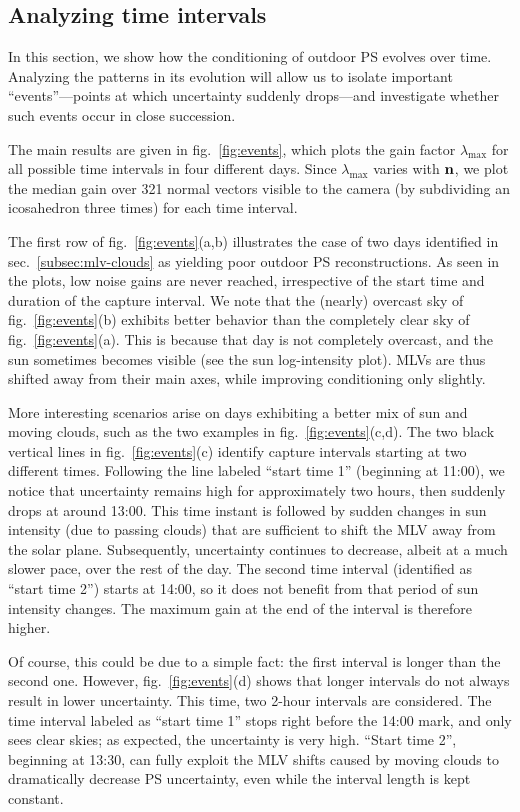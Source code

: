 \subsection{Analyzing time intervals}

In this section, we show how the conditioning of outdoor PS evolves over time. Analyzing the patterns in its evolution will allow us to isolate important ``events''---points at which uncertainty suddenly drops---and investigate whether such events occur in close succession.

The main results are given in fig.~\ref{fig:events}, which plots the gain factor $\lambda_{\max}$ for all possible time intervals in four different days. Since $\lambda_{\max}$ varies with ${\bf n}$, we plot the median gain over 321 normal vectors visible to the camera (by subdividing an icosahedron three times) for each time interval.

The first row of fig.~\ref{fig:events}(a,b) illustrates the case of two days identified in sec.~\ref{subsec:mlv-clouds} as yielding poor outdoor PS reconstructions. As seen in the plots, low noise gains are never reached, irrespective of the start time and duration of the capture interval. We note that the (nearly) overcast sky of fig.~\ref{fig:events}(b) exhibits better behavior than the completely clear sky of fig.~\ref{fig:events}(a). This is because that day is not completely overcast, and the sun sometimes becomes visible (see the sun log-intensity plot). MLVs are thus shifted away from their main axes, while improving conditioning only slightly.

More interesting scenarios arise on days exhibiting a better mix of sun and moving clouds, such as the two examples in fig.~\ref{fig:events}(c,d). The two black vertical lines in fig.~\ref{fig:events}(c) identify capture intervals starting at two different times. Following the line labeled ``start time 1'' (beginning at 11:00), we notice that uncertainty remains high for approximately two hours, then suddenly drops at around 13:00. This time instant is followed by sudden changes in sun intensity (due to passing clouds) that are sufficient to shift the MLV away from the solar plane. Subsequently, uncertainty continues to decrease, albeit at a much slower pace, over the rest of the day. The second time interval (identified as ``start time 2'') starts at 14:00, so it does not benefit from that period of sun intensity changes. The maximum gain at the end of the interval is therefore higher. 

Of course, this could be due to a simple fact: the first interval is longer than the second one. However, fig.~\ref{fig:events}(d) shows that longer intervals do not always result in lower uncertainty. This time, two 2-hour intervals are considered. The time interval labeled as ``start time 1'' stops right before the 14:00 mark, and only sees clear skies; as expected, the uncertainty is very high. ``Start time 2'', beginning at 13:30, can fully exploit the MLV shifts caused by moving clouds to dramatically decrease PS uncertainty, even while the interval length is kept constant.
  
